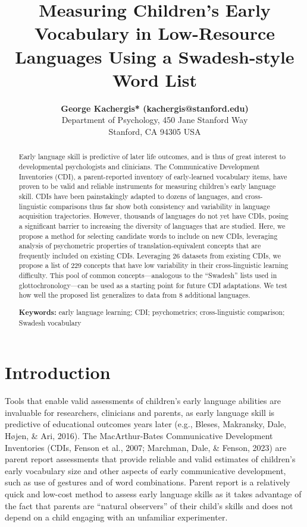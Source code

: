 \documentclass[10pt, letterpaper]{article}
\title{Measuring Children's Early Vocabulary in Low-Resource Languages
Using a Swadesh-style Word List}
\author{{\large \bf George Kachergis* (kachergis@stanford.edu)}  \AND {\large \bf Alvin Wei Ming Tan* (tanawm@stanford.edu)} \AND {\large \bf Virginia A. Marchman (marchman@stanford.edu)}  \AND {\large \bf Michael C. Frank (mcfrank@stanford.edu)} \\ Department of Psychology, 450 Jane Stanford Way \\ Stanford, CA 94305 USA}
\begin{document}
\maketitle

\begin{abstract}
Early language skill is predictive of later life outcomes, and is thus
of great interest to developmental psychologists and clinicians. The
Communicative Development Inventories (CDI), a parent-reported inventory
of early-learned vocabulary items, have proven to be valid and reliable
instruments for measuring children's early language skill. CDIs have
been painstakingly adapted to dozens of languages, and cross-linguistic
comparisons thus far show both consistency and variability in language
acquisition trajectories. However, thousands of languages do not yet
have CDIs, posing a significant barrier to increasing the diversity of
languages that are studied. Here, we propose a method for selecting
candidate words to include on new CDIs, leveraging analysis of
psychometric properties of translation-equivalent concepts that are
frequently included on existing CDIs. Leveraging 26 datasets from
existing CDIs, we propose a list of 229 concepts that have low
variability in their cross-linguistic learning difficulty. This pool of
common concepts---analogous to the ``Swadesh'' lists used in
glottochronology---can be used as a starting point for future CDI
adaptations. We test how well the proposed list generalizes to data from
8 additional languages.

\textbf{Keywords:}
early language learning; CDI; psychometrics; cross-linguistic
comparison; Swadesh vocabulary
\end{abstract}

\hypertarget{introduction}{%
\section{Introduction}\label{introduction}}

Tools that enable valid assessments of children's early language
abilities are invaluable for researchers, clinicians and parents, as
early language skill is predictive of educational outcomes years later
(e.g., Bleses, Makransky, Dale, Højen, \& Ari, 2016). The
MacArthur-Bates Communicative Development Inventories (CDIs, Fenson et
al., 2007; Marchman, Dale, \& Fenson, 2023) are parent report
assessments that provide reliable and valid estimates of children's
early vocabulary size and other aspects of early communicative
development, such as use of gestures and of word combinations. Parent
report is a relatively quick and low-cost method to assess early
language skills as it takes advantage of the fact that parents are
``natural observers'' of their child's skills and does not depend on a
child engaging with an unfamiliar experimenter.
\end{document}
